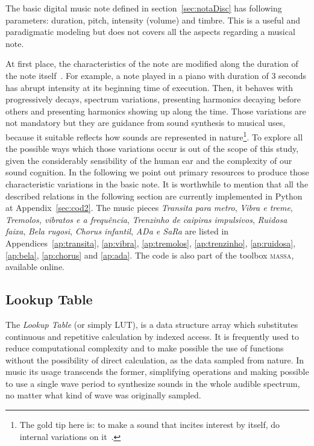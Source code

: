 \documentclass[
 aip,
 jmp,
 amsmath,amssymb,
 reprint,
]{revtex4-1}
\newcommand{\massa}{{\large \textsc{massa}}}
\begin{document}
The basic digital music note defined in section~\ref{sec:notaDisc} has following parameters: duration, pitch, intensity (volume) and timbre. This is a useful and paradigmatic modeling but does not covers all the aspects regarding a musical note.

At first place, the characteristics of the note are modified along the duration of the note itself~\cite{Chowning}. For example, a note played in a piano with duration of 3 seconds has abrupt intensity at its beginning time of execution. Then, it behaves with progressively decays, spectrum variations, presenting harmonics decaying before others and presenting harmonics showing up along the time.
Those variations are not mandatory but they are guidance from sound synthesis to musical uses, because it suitable reflects how sounds are represented in nature\footnote{The gold tip here is: to make a sound that incites interest by itself, do internal variations on it~\cite{Roederer}.}.
To explore all the possible ways which those variations occur is out of the scope of this study, given the considerably sensibility of the human ear and the complexity of our sound cognition. In the following we point out primary resources to produce those characteristic variations in the basic note. It is worthwhile to mention that all the described relations in the following section are currently implemented in Python at Appendix~\ref{sec:cod2}. The music pieces \emph{Transita para metro}, \emph{Vibra e treme}, \emph{Tremolos, vibratos e a frequência}, \emph{Trenzinho de caipiras impulsivos}, \emph{Ruidosa faixa}, \emph{Bela rugosi}, \emph{Chorus infantil}, \emph{ADa e SaRa} are listed in Appendices~\ref{ap:transita}, \ref{ap:vibra}, \ref{ap:tremolos}, \ref{ap:trenzinho}, \ref{ap:ruidosa}, \ref{ap:bela}, \ref{ap:chorus} and \ref{ap:ada}. The code is also part of the toolbox \massa, available online.\cite{MASSA}
 
\subsection{Lookup Table}\label{subsec:lookup}

The \emph{Lookup Table} (or simply LUT), is a data structure array which substitutes continuous and repetitive calculation by indexed access. It is frequently used to reduce computational complexity and to make possible the use of functions without the possibility of direct calculation, as the data sampled from nature.
In music its usage transcends the former, simplifying operations and making possible to use a single wave period to synthesize sounds in the whole audible spectrum, no matter what kind of wave was originally sampled.
\end{document}
